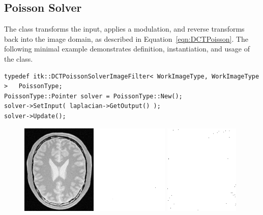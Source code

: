 \subsection{Poisson Solver}

The  class transforms the input, applies a modulation, and reverse transforms back into the image domain, as described in Equation~\ref{eqn:DCTPoisson}.  The following minimal example demonstrates definition, instantiation, and usage of the  class.

\small
\begin{verbatim}
typedef itk::DCTPoissonSolverImageFilter< WorkImageType, WorkImageType >   PoissonType;
PoissonType::Pointer solver = PoissonType::New();
solver->SetInput( laplacian->GetOutput() );
solver->Update();
\end{verbatim}
\normalsize

\begin{figure}
\center
\includegraphics[width=0.32\textwidth]{images/appendix/brain.png}
\includegraphics[width=0.32\textwidth]{images/appendix/laplacian.png}
\includegraphics[width=0.32\textwidth]{images/appendix/solution.png}
\label{fig:Laplacian}
\end{figure}

